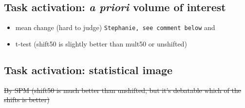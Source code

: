 \subsection{Task activation: \textit{a priori} volume of interest}
  \begin{itemize} 
    \item mean change (hard to judge) \verb|Stephanie, see comment below| and 
    \item t-test (shift50 is slightly better than mult50 or unshifted)
  \end{itemize}

\subsection{Task activation: statistical image}
\sout{By SPM (shift50 is much better than unshifted, but it's debatable which of the shifts is better)}


